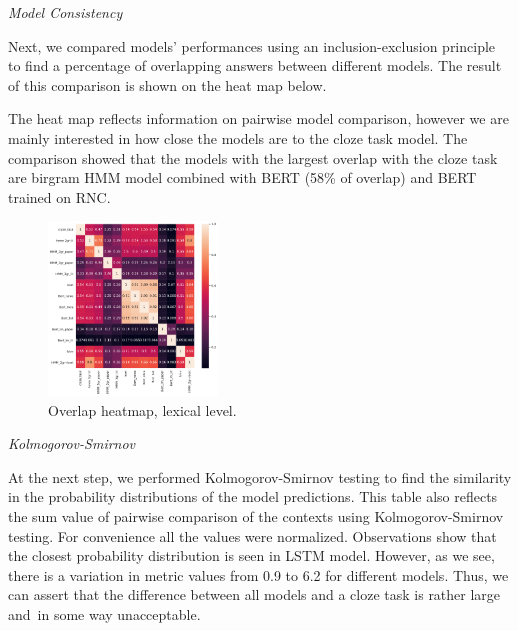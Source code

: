 \documentclass[a4paper]{article}
\newcommand{\head}[1]{\vspace{0.5em}\emph{#1}\vspace{0.25em}}
\begin{document}
\head{Model Consistency}

Next, we compared models’ performances using an inclusion-exclusion principle to find a percentage of overlapping answers between different models. The result of this comparison is shown on the heat map below.

The heat map reflects information on pairwise model comparison,
however we are mainly interested in how close the models are to the
cloze task model. The comparison showed that the models with the
largest overlap with the cloze task are birgram HMM model combined
with BERT (58\% of overlap) and BERT trained on RNC.

\begin{figure}
\caption{Overlap heatmap, lexical level.}
\label{fig:heatmap-context-accord-lex}
\centering
\includegraphics[width=0.4\textwidth]{figures/pdf/heatmap-context-accord-lex.pdf}
\end{figure}

\head{Kolmogorov-Smirnov}

At the next step, we performed Kolmogorov-Smirnov testing to find the similarity in the probability distributions of the model predictions. This table also reflects the sum value of pairwise comparison of the contexts using Kolmogorov-Smirnov testing. For convenience all the values were normalized. Observations show that the closest probability distribution is seen in LSTM model. However, as we see, there is a variation in metric values from 0.9 to 6.2 for different models. Thus, we can assert that the difference between all models and a cloze task is rather large and in some way unacceptable.




%
\end{document}
